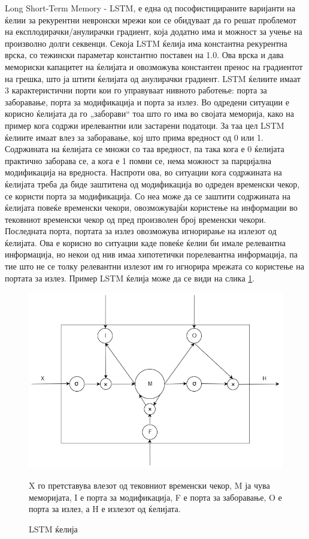 Long Short-Term Memory - LSTM, е една од пософистицираните варијанти на ќелии за рекурентни невронски мрежи кои се обидуваат да го решат проблемот на експлодирачки/анулирачки градиент, која додатно има и можност за учење на произволно долги секвенци. Секоја LSTM ќелија има константна рекурентна врска, со тежински параметар константно поставен на 1.0. Ова врска и дава мемориски капацитет на ќелијата и овозможува константен пренос на градиентот на грешка, што ја штити ќелијата од анулирачки градиент. 
LSTM ќелиите имаат 3 карактеристични порти кои го управуваат нивното работење: порта за заборавање, порта за модификација и порта за излез. Во одредени ситуации е корисно ќелијата да го „заборави“ тоа што го има во својата меморија, како на пример кога содржи ирелевантни или застарени податоци. За таа цел LSTM ќелиите имаат влез за заборавање, кој што прима вредност од 0 или 1. Содржината на ќелијата се множи со таа вредност, па така кога е 0 ќелијата практично заборава се, а кога е 1 помни се, нема можност за парцијална модификација на вредноста. Наспроти ова, во ситуации кога содржината на ќелијата треба да биде заштитена од модификација во одреден временски чекор, се користи порта за модификација. Со неа може да се заштити содржината на ќелијата повеќе временски чекори, овозможувајќи користење на информации во тековниот временски чекор од пред произволен број временски чекори. Последната порта, портата за излез овозможува игнорирање на излезот од ќелијата. Ова е корисно во ситуации каде повеќе ќелии би имале релевантна информација, но некои од нив имаа хипотетички порелевантна информација, па тие што не се толку релевантни излезот им го игнорира мрежата со користење на портата за излез. Пример LSTM ќелија може да се види на слика \ref{fig:lstm}.

\begin{figure}[H]
	\centering
    \includegraphics[scale=0.6]{images/lstm.png}
	\caption{LSTM ќелија}
	X го претставува влезот од тековниот временски чекор, M ја чува меморијата, I е порта за модификација, F е порта за заборавање, O е порта за излез, а H е излезот од ќелијата.
	\label{fig:lstm}
\end{figure}

